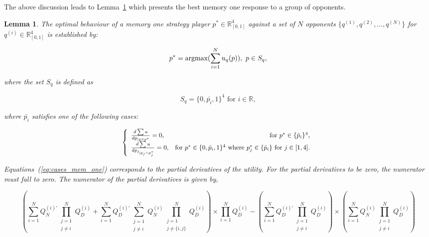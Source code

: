 \documentclass[10pt]{article}
\newcommand{\R}{\mathbb{R}}
\newtheorem{lemma}[theorem]{Lemma}
\begin{document}
The above discussion leads to Lemma~\ref{lemma:memone_group_best_response} which
presents the best memory one response to a group of opponents.

\begin{lemma}\label{lemma:memone_group_best_response}
    The optimal behaviour of a memory one strategy player \(p^* \in \R_{[0, 1]} ^ 4\)
    against a set of \(N\) opponents \(\{q^{(1)}, q^{(2)}, \dots, q^{(N)} \}\)
    for \(q^{(i)} \in \R_{[0, 1]} ^ 4\) is established by:
    
    \[p^* = \textnormal{argmax}(\sum\limits_{i=1} ^ N  u_q(p)), \ p \in S_q,\]
    
    where the set \(S_q\) is defined as 
    
    \[S_q = \{0, \bar{p_i}, 1 \}^4 \text{ for } i \in \R,\]
    
    where \(\bar{p_i}\) satisfies one of the following cases:

    \begin{equation}\label{eq:cases_mem_one}\resizebox{.8\hsize}{!}{$
        \left\{\begin{array}{lr}
        \frac{d\sum u}{dp_{|p=p^*}} = 0, & \text{for } p^* \in \{\bar{p}_i\} ^ 4, \\
        \frac{d\sum u}{dp_{j_{|p_j=p_j^*}}} = 0, & \text{for } p^* \in \{0, \bar{p}_i, 1\} ^ 4
        \text{ where } p_j ^ * \in \{\bar{p}_i\} \text{ for } j \in [1, 4].\\
        \end{array}\right.$}
    \end{equation}

    Equations~(\ref{eq:cases_mem_one}) corresponds to the partial derivatives of the
    utility. For the partial derivatives to be zero, the numerator must fall
    to zero. The numerator of the partial derivatives is given by,

    \begin{equation}\label{eq:group_derivative_numerator_condition}
    (\sum\limits_{i=1} ^ {N} Q_{N}^{(i)'} \prod_{\substack{j=1 \\ j \neq i}} ^ N Q_{D}^{(i)}
     + \sum\limits_{i=1} ^ {N} Q_{D}^{(i)'} \sum_{\substack{j=1 \\ j \neq i}} ^ {N} Q_{N}^{(i)}
    \prod_{\substack{j=1 \\ j \neq \{i, j\}}} ^ N Q_{D}^{(i)}) \times
    \prod\limits_{i=1} ^ N Q_{D}^{(i)} - (\sum\limits_{i=1} ^ {N} Q_{D}^{(i)'}
    \prod_{\substack{j=1 \\ j \neq i}} ^ N Q_{D}^{(i)}) \times 
    (\sum\limits_{i=1} ^ {N} Q_{N}^{(i)} \prod_{\substack{j=1 \\ j \neq i}} ^ N Q_{D}^{(i)})
    \end{equation}


\end{lemma}
\end{document}
